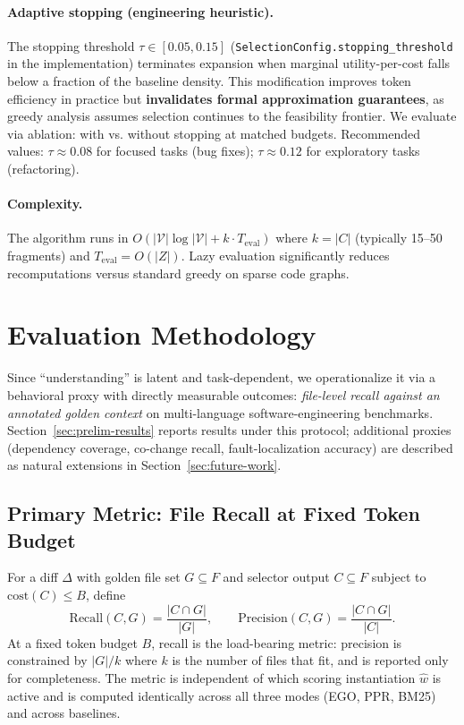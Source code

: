 \documentclass[11pt, a4paper]{article}
\begin{document}
\paragraph{Adaptive stopping (engineering heuristic).} The stopping threshold $\tau \in [0.05, 0.15]$ (\texttt{SelectionConfig.stopping\_threshold} in the implementation) terminates expansion when marginal utility-per-cost falls below a fraction of the baseline density. This modification improves token efficiency in practice but \textbf{invalidates formal approximation guarantees}, as greedy analysis assumes selection continues to the feasibility frontier. We evaluate via ablation: with vs. without stopping at matched budgets. Recommended values: $\tau \approx 0.08$ for focused tasks (bug fixes); $\tau \approx 0.12$ for exploratory tasks (refactoring).

\paragraph{Complexity.}
The algorithm runs in $O(|\mathcal{V}| \log |\mathcal{V}| + k \cdot T_{\text{eval}})$ where $k = |C|$ (typically 15--50 fragments) and $T_{\text{eval}} = O(|Z|)$. Lazy evaluation significantly reduces recomputations versus standard greedy on sparse code graphs.

\newpage
\section{Evaluation Methodology}
\label{sec:eval}

Since ``understanding'' is latent and task-dependent, we operationalize it via a behavioral proxy with directly measurable outcomes: \emph{file-level recall against an annotated golden context} on multi-language software-engineering benchmarks. Section~\ref{sec:prelim-results} reports results under this protocol; additional proxies (dependency coverage, co-change recall, fault-localization accuracy) are described as natural extensions in Section~\ref{sec:future-work}.

\subsection{Primary Metric: File Recall at Fixed Token Budget}

For a diff $\Delta$ with golden file set $G \subseteq F$ and selector output $C \subseteq F$ subject to $\mathrm{cost}(C) \leq B$, define
\begin{equation}
\mathrm{Recall}(C, G) = \frac{|C \cap G|}{|G|}, \qquad \mathrm{Precision}(C, G) = \frac{|C \cap G|}{|C|}.
\end{equation}
At a fixed token budget $B$, recall is the load-bearing metric: precision is constrained by $|G|/k$ where $k$ is the number of files that fit, and is reported only for completeness. The metric is independent of which scoring instantiation $\hat{w}$ is active and is computed identically across all three modes (EGO, PPR, BM25) and across baselines.
\end{document}
